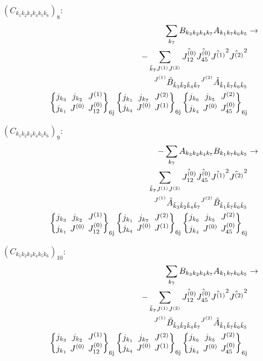 \documentclass[11pt]{article}
\newcommand{\sixj}[6]{\begingroup\setlength{\arraycolsep}{0.2em}\begin{Bmatrix} #1 & #2 & #3 \\ #4 & #5 & #6 \end{Bmatrix}_{\text{6j}}\endgroup}
\begin{document}
$\left({C}_{{k}_{1}{k}_{2}{k}_{3}{k}_{4}{k}_{5}{k}_{6}}\right)_{8}$:
\begin{align}
\sum_{{k}_{7}}{B}_{{k}_{3}{k}_{2}{k}_{4}{k}_{7}}{A}_{{k}_{1}{k}_{7}{k}_{6}{k}_{5}}&\rightarrow \notag \\-\sum_{\tilde{k}_{7}J^{(1)}J^{(2)}}\hat{J^{(0)}_{12}}\hat{J^{(0)}_{45}}\hat{J^{(1)}}^{2}\hat{J^{(2)}}^{2}& \notag \\{}^{J^{(1)}}\tilde{B}_{\tilde{k}_{3}\tilde{k}_{2}\tilde{k}_{4}\tilde{k}_{7}}{}^{J^{(2)}}\tilde{A}_{\tilde{k}_{1}\tilde{k}_{7}\tilde{k}_{6}\tilde{k}_{5}}& \notag \\\sixj{j_{{k}_{3}}}{j_{{k}_{2}}}{J^{(1)}}{j_{{k}_{1}}}{J^{(0)}}{J^{(0)}_{12}}\sixj{j_{{k}_{1}}}{j_{{k}_{7}}}{J^{(2)}}{j_{{k}_{4}}}{J^{(0)}}{J^{(1)}}\sixj{j_{{k}_{6}}}{j_{{k}_{5}}}{J^{(2)}}{j_{{k}_{4}}}{J^{(0)}}{J^{(0)}_{45}}
\end{align}

$\left({C}_{{k}_{1}{k}_{2}{k}_{3}{k}_{4}{k}_{5}{k}_{6}}\right)_{9}$:
\begin{align}
-\sum_{{k}_{7}}{A}_{{k}_{3}{k}_{2}{k}_{4}{k}_{7}}{B}_{{k}_{1}{k}_{7}{k}_{6}{k}_{5}}&\rightarrow \notag \\\sum_{\tilde{k}_{7}J^{(1)}J^{(2)}}\hat{J^{(0)}_{12}}\hat{J^{(0)}_{45}}\hat{J^{(1)}}^{2}\hat{J^{(2)}}^{2}& \notag \\{}^{J^{(1)}}\tilde{A}_{\tilde{k}_{3}\tilde{k}_{2}\tilde{k}_{4}\tilde{k}_{7}}{}^{J^{(2)}}\tilde{B}_{\tilde{k}_{1}\tilde{k}_{7}\tilde{k}_{6}\tilde{k}_{5}}& \notag \\\sixj{j_{{k}_{3}}}{j_{{k}_{2}}}{J^{(1)}}{j_{{k}_{1}}}{J^{(0)}}{J^{(0)}_{12}}\sixj{j_{{k}_{1}}}{j_{{k}_{7}}}{J^{(2)}}{j_{{k}_{4}}}{J^{(0)}}{J^{(1)}}\sixj{j_{{k}_{6}}}{j_{{k}_{5}}}{J^{(2)}}{j_{{k}_{4}}}{J^{(0)}}{J^{(0)}_{45}}
\end{align}

$\left({C}_{{k}_{1}{k}_{2}{k}_{3}{k}_{4}{k}_{5}{k}_{6}}\right)_{10}$:
\begin{align}
\sum_{{k}_{7}}{B}_{{k}_{3}{k}_{2}{k}_{4}{k}_{7}}{A}_{{k}_{1}{k}_{7}{k}_{6}{k}_{5}}&\rightarrow \notag \\-\sum_{\tilde{k}_{7}J^{(1)}J^{(2)}}\hat{J^{(0)}_{12}}\hat{J^{(0)}_{45}}\hat{J^{(1)}}^{2}\hat{J^{(2)}}^{2}& \notag \\{}^{J^{(1)}}\tilde{B}_{\tilde{k}_{3}\tilde{k}_{2}\tilde{k}_{4}\tilde{k}_{7}}{}^{J^{(2)}}\tilde{A}_{\tilde{k}_{1}\tilde{k}_{7}\tilde{k}_{6}\tilde{k}_{5}}& \notag \\\sixj{j_{{k}_{3}}}{j_{{k}_{2}}}{J^{(1)}}{j_{{k}_{1}}}{J^{(0)}}{J^{(0)}_{12}}\sixj{j_{{k}_{1}}}{j_{{k}_{7}}}{J^{(2)}}{j_{{k}_{4}}}{J^{(0)}}{J^{(1)}}\sixj{j_{{k}_{6}}}{j_{{k}_{5}}}{J^{(2)}}{j_{{k}_{4}}}{J^{(0)}}{J^{(0)}_{45}}
\end{align}
\end{document}
